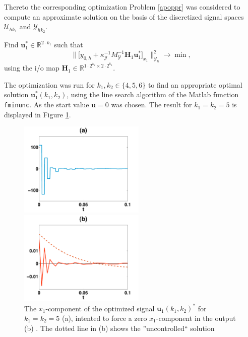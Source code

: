 \documentclass[a4paper,10pt,BCOR=15mm]{scrbook}
\providecommand{\norm}[1]{\lVert#1 \rVert}
\begin{document}
Thereto the corresponding optimization Problem \ref{apoppr} was considered to compute an approximate solution on the basis of the discretized signal spaces $\mathcal U_{hk_1}$ and $\mathcal Y_{hk_2}$.

Find $\mathbf u^*_{1}\in \mathbb R^{2\cdot k_1}$ such that
\begin{equation*}
 \norm{\bigl [y_{0,h} + \kappa_{\mathcal Y}^{-1} M_{\mathcal Y}^{-1} \mathbf H_1 \mathbf u^*_{1}\bigr ]_{x_1} }^2_{\mathcal Y_h} \rightarrow \min,
\end{equation*}
using the i/o map $\mathbf H_1 \in \mathbb R ^{1 \cdot 2^{k_2} \times 2 \cdot 2^{k_1}}$.

The optimization was run for $k_1,k_2 \in \{4,5,6\}$ to find an appropriate optimal solution $\mathbf u^*_{1}(k_1,k_2)$, using the line search algorithm of the Matlab \cite{matl} function \texttt{fminunc}. As the start value $\mathbf u = 0$ was chosen. The result for $k_1=k_2=5$ is displayed in Figure \ref{1dopti}.

\begin{figure}[htbp]
  \centering
  \begin{minipage}[b]{6 cm}
    \includegraphics[width=6cm]{pics/1doptiinp.pdf}  
  \end{minipage}
  \begin{minipage}[b]{6 cm}
    \includegraphics[width=6cm]{pics/1doptires.pdf}  
  \end{minipage}
  \caption{The $x_1$-component of the optimized signal $\mathbf u_{1}(k_1,k_2) ^*$ for $k_1= k_2 = 5$ (a), intented to force a zero $x_1$-component in the output (b) . The dotted line in (b) shows the ''uncontrolled`` solution } 
\label{1dopti}
\end{figure}
\end{document}
